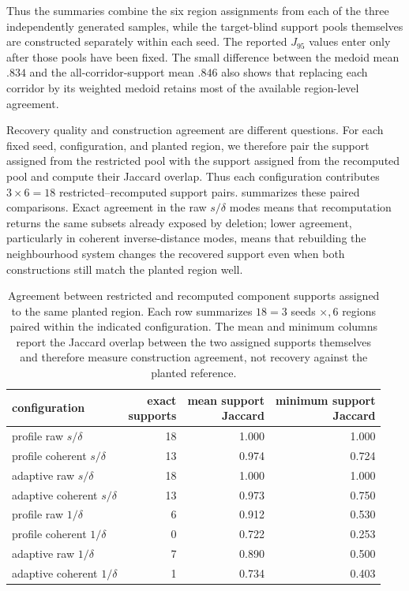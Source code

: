 \documentclass[a4paper,11pt]{article}
\theoremstyle{definition}
\theoremstyle{remark}
\begin{document}
Thus the summaries combine the six region assignments from each of the three independently generated samples, while the target-blind support pools themselves are constructed separately within each seed. The reported $J_{95}$ values enter only after those pools have been fixed. The small difference between the medoid mean $.834$ and the all-corridor-support mean $.846$ also shows that replacing each corridor by its weighted medoid retains most of the available region-level agreement.

Recovery quality and construction agreement are different questions. For each fixed seed, configuration, and planted region, we therefore pair the support assigned from the restricted pool with the support assigned from the recomputed pool and compute their Jaccard overlap. Thus each configuration contributes $3\times6=18$ restricted–recomputed support pairs.  summarizes these paired comparisons. Exact agreement in the raw $s/\delta$ modes means that recomputation returns the same subsets already exposed by deletion; lower agreement, particularly in coherent inverse-distance modes, means that rebuilding the neighbourhood system changes the recovered support even when both constructions still match the planted region well.

\begin{table}[!ht]
\centering
\small
\caption{Agreement between restricted and recomputed component supports assigned to the same planted region. Each row summarizes $18=3$ seeds $\times,6$ regions paired within the indicated configuration. The mean and minimum columns report the Jaccard overlap between the two assigned supports themselves and therefore measure construction agreement, not recovery against the planted reference.}
\label{tab:mixed-bumps-restrict-recompute-agreement}
\setlength{\tabcolsep}{5.0pt}
\begin{tabular}{@{}lrrr@{}}
\toprule
configuration & \shortstack{exact\\supports} & \shortstack{mean support\\Jaccard} & \shortstack{minimum support\\Jaccard} \\
\midrule
profile raw $s/\delta$ & 18 & 1.000 & 1.000 \\
profile coherent $s/\delta$ & 13 & 0.974 & 0.724 \\
adaptive raw $s/\delta$ & 18 & 1.000 & 1.000 \\
adaptive coherent $s/\delta$ & 13 & 0.973 & 0.750 \\
profile raw $1/\delta$ & 6 & 0.912 & 0.530 \\
profile coherent $1/\delta$ & 0 & 0.722 & 0.253 \\
adaptive raw $1/\delta$ & 7 & 0.890 & 0.500 \\
adaptive coherent $1/\delta$ & 1 & 0.734 & 0.403 \\
\bottomrule
\end{tabular}
\end{table}
\end{document}
